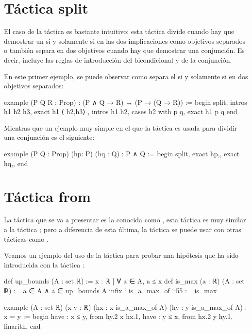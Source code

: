 
\section{Táctica split}

El caso de la táctica  es bastante intuitivo: esta táctica
divide cuando hay que demostrar un si y solamente si en las dos implicaciones
como objetivos separados o también separa en dos objetivos cuando hay que
demostrar una conjunción. Es decir, incluye las reglas de introducción
del bicondicional y de la conjunción.

En este primer ejemplo, se puede observar como separa el si y solamente si en
dos objetivos separados:

\begin{leancode}
example (P Q R : Prop) : (P ∧ Q → R) ↔ (P → (Q → R)) :=
begin
  split,
  { intros h1 h2 h3,
    exact h1 ⟨ h2,h3⟩ },
  { intros h1 h2,
    cases h2 with p q,
    exact h1 p q}
end
\end{leancode}

Mientras que un ejemplo muy simple en el que la táctica 
es usada para dividir una conjunción es el siguiente:
\begin{leancode}
example (P Q : Prop) (hp: P) (hq : Q) : P ∧ Q :=
begin
  split,
  { exact hp,},
  { exact hq,},
end
\end{leancode}

\section{Táctica from}

La táctica que se va a presentar es la conocida como , esta
táctica es muy similar a la táctica ; pero a diferencia
de esta última, la táctica  se puede usar con otras tácticas
como .

Veamos un ejemplo del uso de la táctica  para probar una
hipótesis que ha sido introducida con la táctica :

\begin{leancode}
def up_bounds (A : set ℝ) := { x : ℝ | ∀ a ∈ A, a ≤ x}
def is_max (a : ℝ) (A : set ℝ) := a ∈ A ∧ a ∈ up_bounds A
infix ` is_a_max_of `:55 := is_max

example (A : set ℝ) (x y : ℝ) (hx : x is_a_max_of A) (hy : y is_a_max_of A) :
x = y :=
begin
  have : x ≤ y, from hy.2 x hx.1,
  have : y ≤ x, from hx.2 y hy.1,
  linarith,
end
\end{leancode}

